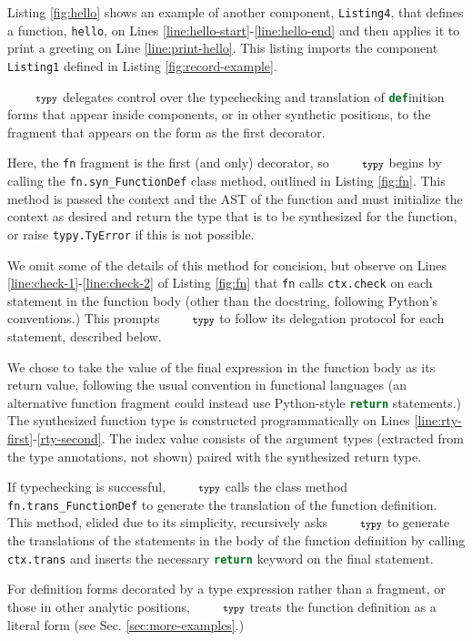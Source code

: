 \documentclass[10pt]{sigplanconf}
\newcommand{\typy}{\texttt{\footnotesize typy}}
\newcommand{\lip}[1]{\lstinline[language=Python,basicstyle=\ttfamily\footnotesize,morekeywords={with},deletendkeywords={tuple,buffer,map}]{#1}}
\newcommand{\li}[1]{\lip{#1}}
\begin{document}
Listing \ref{fig:hello} shows an example of another component, \li{Listing4}, that defines a function, \li{hello}, on Lines \ref{line:hello-start}-\ref{line:hello-end} and then applies it to print a greeting on Line \ref{line:print-hello}. This listing imports the component \li{Listing1} defined in Listing \ref{fig:record-example}. %

$\typy$ delegates control over the typechecking and translation of \li{def}inition forms that appear inside components, or in other synthetic positions, to the fragment that appears on the form as the first decorator.

Here, the \li{fn} fragment is the first (and only) decorator, so $\typy$ begins by calling the \li{fn.syn_FunctionDef} class method, outlined in Listing \ref{fig:fn}. This method is passed the context and the AST of the function and must initialize the context as desired and return the type that is to be synthesized for the function, or raise \li{typy.TyError} if this is not possible. 

We omit some of the details of this method for concision, but observe on Lines \ref{line:check-1}-\ref{line:check-2} of Listing \ref{fig:fn} that \li{fn} calls \li{ctx.check} on each statement in the function body (other than the docstring, following Python's conventions.) This prompts $\typy$ to follow its delegation protocol for each statement, described below. 

We chose to take the value of the final expression in the function body as its return value, following the usual convention in functional languages (an alternative function fragment could instead use Python-style \li{return} statements.) The synthesized function type is constructed programmatically on Lines \ref{line:rty-first}-\ref{rty-second}. The index value consists of the argument types (extracted from the type annotations, not shown) paired with the synthesized return type.

If typechecking is successful, $\typy$ calls the class method \li{fn.trans_FunctionDef} to generate the translation of the function definition. This method, elided due to its simplicity, recursively asks $\typy$ to generate the translations of the statements in the body of the function definition by calling \li{ctx.trans} and inserts the necessary \li{return} keyword on the final statement.

For definition forms decorated by a type expression rather than a fragment, or those in other analytic positions, $\typy$ treats the function definition as a literal form (see Sec. \ref{sec:more-examples}.)
\end{document}
